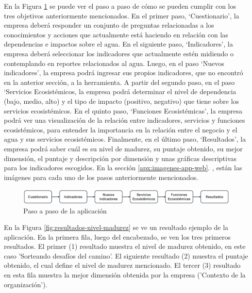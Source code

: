 En la Figura \ref{fig:paso-paso-app} se puede ver el paso a paso de cómo se pueden cumplir con los tres objetivos anteriormente mencionados. En el primer paso, ‘Cuestionario’, la empresa deberá responder un conjunto de preguntas relacionadas a los conocimientos y acciones que actualmente está haciendo en relación con las dependencias e impactos sobre el agua. En el siguiente paso, ‘Indicadores’, la empresa deberá seleccionar los indicadores que actualmente estén midiendo o contemplando en reportes relacionados al agua. Luego, en el paso ‘Nuevos indicadores’, la empresa podrá ingresar sus propios indicadores, que no encontró en la anterior sección, a la herramienta. A partir del segundo paso, en el paso ‘Servicios Ecosistémicos, la empresa podrá determinar el nivel de dependencia (bajo, medio, alto) y el tipo de impacto (positivo, negativo) que tiene sobre los servicios ecosistémicos. En el quinto paso, ‘Funciones Ecosistémicas’, la empresa podrá ver una visualización de la relación entre indicadores, servicios y funciones ecosistémicos, para entender la importancia en la relación entre el negocio y el agua y sus servicios ecosistémicos. Finalmente, en el último paso, ‘Resultados’, la empresa podrá saber cuál es su nivel de madurez, su puntaje obtenido, su mejor dimensión, el puntaje y descripción por dimensión y unas gráficas descriptivas para los indicadores escogidos. En la sección \ref{apx:imagenes-app-web}. , están las imágenes para cada uno de los pasos anteriormente mencionados.

\begin{figure}[H]
    \centering
    \includegraphics[scale=0.4]{images/5-implementacion/paso-a-paso-app.png}
    \caption{Paso a paso de la aplicación}
    \label{fig:paso-paso-app}
\end{figure}

En la Figura \ref{fig:resultados-nivel-madurez} se ve un resultado ejemplo de la aplicación. En la primera fila, luego del encabezado, se ven los tres primeros resultados. El primer (1) resultado muestra el nivel de madurez obtenido, en este caso 'Sorteando desafíos del camino'. El siguiente resultado (2) muestra el puntaje obtenido, el cual define el nivel de madurez mencionado. El tercer (3) resultado en esta fila muestra la mejor dimensión obtenida por la empresa ('Contexto de la organización').

